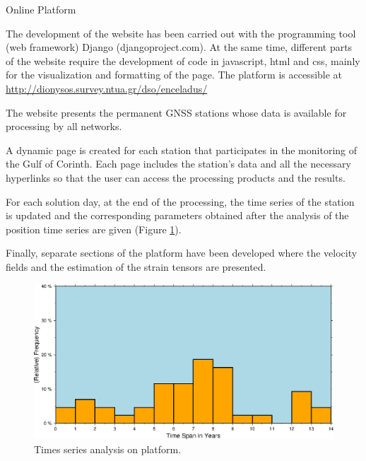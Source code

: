 \documentclass[final,a0,portrait]{beamer}
\newlength{\onecolwid}
\begin{document}
\begin{frame}[t]
\begin{columns}[t]

\begin{column}{\onecolwid} %


\begin{block}{Online Platform}
{\small
The development of the website has been carried out with the programming tool (web framework) Django (djangoproject.com). At the same time, different parts of the website require the development of code in javascript, html and css, mainly for the visualization and formatting of the page. The platform is accessible at \url{http://dionysos.survey.ntua.gr/dso/enceladus/} 

The website presents the permanent GNSS stations whose data is available for processing by all networks.

A dynamic page is created for each station that participates in the monitoring of the Gulf of Corinth. Each page includes the station's data and all the necessary hyperlinks so that the user can access the processing products and the results.

For each solution day, at the end of the processing, the time series of the station is updated and the corresponding parameters obtained after the analysis of the position time series are given (Figure \ref{fig:vels}).

Finally, separate sections of the platform have been developed where the velocity fields and the estimation of the strain tensors are presented.

}

\begin{figure}
    \includegraphics[width=1\onecolwid]{sample}
    \caption{Times series analysis on platform.}
    \label{fig:vels}
\end{figure}


\end{block}
\end{column}
\end{columns}
\end{frame}
\end{document}
